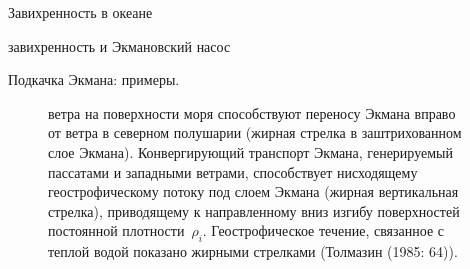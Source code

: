 \begin{chapter}{Завихренность в океане}
\begin{section}{завихренность и Экмановский насос}
\begin{paragraph}{Подкачка Экмана: примеры.}
\begin{figure}[t]
\caption{ветра на поверхности моря способствуют переносу Экмана вправо
от ветра в северном полушарии (жирная стрелка в заштрихованном слое
Экмана). Конвергирующий транспорт Экмана, генерируемый пассатами и
западными ветрами, способствует нисходящему геострофическому потоку
под слоем Экмана (жирная вертикальная стрелка), приводящему к
направленному вниз изгибу поверхностей постоянной
плотности~$\rho_i$. Геострофическое течение, связанное с теплой водой
показано жирными стрелками (Толмазин (1985: 64)).}
\label{fig:EkmanPumping}
\end{figure}
%


\end{paragraph}
\end{section}
\end{chapter}
